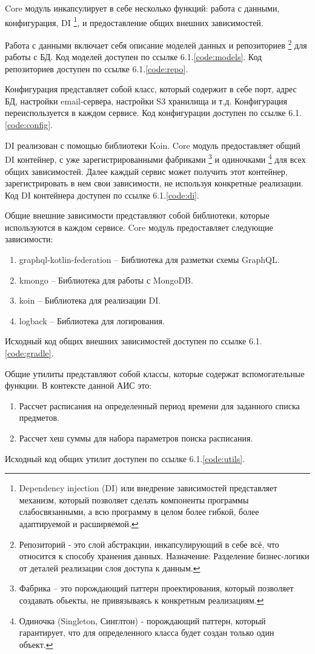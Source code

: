 Core модуль инкапсулирует в себе несколько функций: работа с данными, конфигурация, DI
\footnote{Dependency injection (DI) или внедрение зависимостей представляет механизм, который позволяет сделать компоненты программы слабосвязанными, 
а всю программу в целом более гибкой, более адаптируемой и расширяемой.
}, и предоставление общих внешних зависимостей.

Работа с данными включает себя описание моделей данных и репозиториев
\footnote{Репозиторий - это слой абстракции, инкапсулирующий в себе всё, что относится к способу хранения данных. 
Назначение: Разделение бизнес-логики от деталей реализации слоя доступа к данным.}
для работы с БД. Код моделей доступен по ссылке 6.1.\ref{code:models}. Код репозиториев доступен по ссылке 6.1.\ref{code:repo}.

Конфигурация представляет собой класс, который содержит в себе порт, 
адрес БД, настройки email-сервера, настройки S3 хранилища и т.д.
Конфигурация переиспользуется в каждом сервисе.
Код конфигурации доступен по ссылке 6.1.\ref{code:config}.

DI реализован с помощью библиотеки Koin. Core модуль предоставляет общий DI контейнер, 
с уже зарегистрированными фабриками
\footnote{Фабрика – это порождающий паттерн проектирования, который позволяет создавать обьекты, не привязываясь к конкретным реализациям.}
и одиночками 
\footnote{Одиночка (Singleton, Синглтон) - порождающий паттерн, который гарантирует, что для определенного класса будет создан только один объект.}
для всех общих зависимостей. Далее каждый сервис может получить этот контейнер, 
зарегистрировать в нем свои зависимости, не используя конкретные реализации.
Код DI контейнера доступен по ссылке 6.1.\ref{code:di}.

Общие внешние зависимости представляют собой библиотеки, которые используются в каждом сервисе. 
Core модуль предоставляет следующие зависимости:
\begin{enumerate}
  \item graphql-kotlin-federation -- Библиотека для разметки схемы GraphQL.
  \item kmongo -- Библиотека для работы с MongoDB.
  \item koin -- Библиотека для реализации DI.
  \item logback -- Библиотека для логирования.
\end{enumerate}
Исходный код общих внешних зависимостей доступен по ссылке 6.1.\ref{code:gradle}.

Общие утилиты представляют собой классы, которые содержат вспомогательные функции. В контексте данной АИС это:
\begin{enumerate}
  \item Рассчет расписания на определенный период времени для заданного списка предметов.
  \item Рассчет хеш суммы для набора параметров поиска расписания.
\end{enumerate}
Исходный код общих утилит доступен по ссылке 6.1.\ref{code:utils}.

